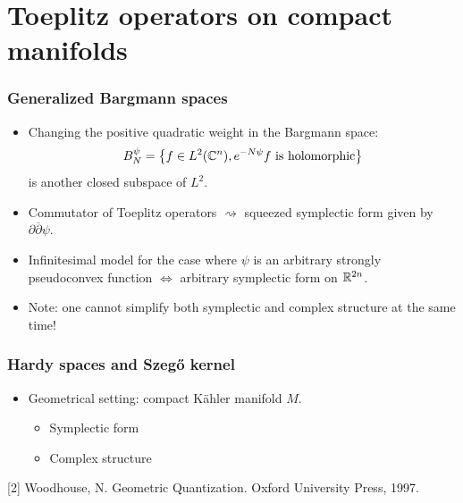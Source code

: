 \documentclass[mathserif]{beamer}
\begin{document}
\section{Toeplitz operators on compact manifolds}
\begin{frame}\frametitle{Generalized Bargmann spaces}
  \begin{itemize}
    \item Changing the positive quadratic weight in the Bargmann space:
  \[
    B_N^{\psi}=\left\{f\in L^2(\mathbb{C}^n), e^{-N\psi}f \text{ is
        holomorphic}\right\}
  \]
  is another closed subspace of $L^2$.

  \item<2-> Commutator of Toeplitz operators $\rightsquigarrow$
    squeezed symplectic form given by
    $\partial\overline{\partial}\psi$.
    
  \item<3-> Infinitesimal model for the case where $\psi$ is an
    arbitrary strongly pseudoconvex function $\Leftrightarrow$ arbitrary
    symplectic form on $\mathbb{R}^{2n}$.
      \item<4> Note: one cannot simplify both symplectic and complex
          structure at the same time!
      \end{itemize}
    \end{frame}

\begin{frame}
  \frametitle{Hardy spaces and Szeg\H{o} kernel}
  \begin{itemize}
  \item Geometrical setting: compact K\"ahler manifold $M$.\\
    \begin{minipage}{0.37\linewidth}\begin{itemize}
    \item Symplectic form
    \item Complex structure
    \end{itemize}
\end{minipage}
  \end{itemize}

\vspace{5em}
\small{[2] Woodhouse, N. Geometric Quantization. Oxford University Press, 1997.}
\end{frame}
\end{document}
